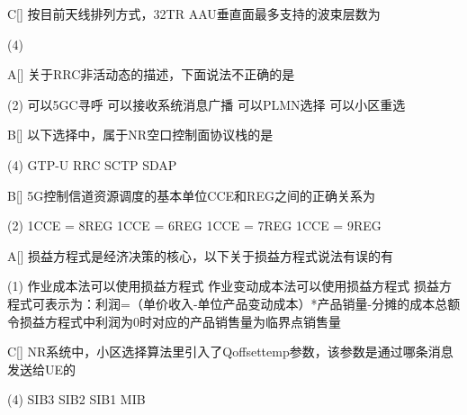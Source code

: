 \begin{choice}{C}[]
    按目前天线排列方式，32TR AAU垂直面最多支持的波束层数为
    \begin{tasks}(4)
    \end{tasks}
\end{choice}


\begin{choice}{A}[]
    关于RRC非活动态的描述，下面说法不正确的是
    \begin{tasks}(2)
        \task 可以5GC寻呼
        \task 可以接收系统消息广播
        \task 可以PLMN选择
        \task 可以小区重选
    \end{tasks}
\end{choice}


\begin{choice}{B}[]
    以下选择中，属于NR空口控制面协议栈的是
    \begin{tasks}(4)
        \task GTP-U
        \task RRC
        \task SCTP
        \task SDAP
    \end{tasks}
\end{choice}


\begin{choice}{B}[]
    5G控制信道资源调度的基本单位CCE和REG之间的正确关系为
    \begin{tasks}(2)
        \task 1CCE = 8REG
        \task 1CCE = 6REG
        \task 1CCE = 7REG
        \task 1CCE = 9REG
    \end{tasks}
\end{choice}

\begin{choice}{A}[]
    损益方程式是经济决策的核心，以下关于损益方程式说法有误的有
    \begin{tasks}(1)
        \task 作业成本法可以使用损益方程式
        \task 作业变动成本法可以使用损益方程式
        \task 损益方程式可表示为：利润=（单价收入-单位产品变动成本）*产品销量-分摊的成本总额
        \task 令损益方程式中利润为0时对应的产品销售量为临界点销售量
    \end{tasks}
\end{choice}

\begin{choice}{C}[]
    NR系统中，小区选择算法里引入了Qoffsettemp参数，该参数是通过哪条消息发送给UE的
    \begin{tasks}(4)
        \task SIB3
        \task SIB2
        \task SIB1
        \task MIB
    \end{tasks}
\end{choice}



